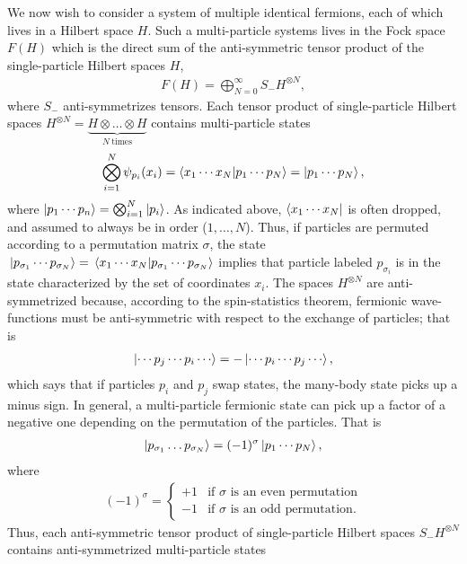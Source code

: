 \documentclass[Dual]{msu-thesis}
\begin{document}
We now wish to consider a system of multiple identical fermions, each of which lives in a Hilbert space $H$. Such a multi-particle systems lives in the Fock space $F(H)$ which is the direct sum of the anti-symmetric tensor product of the single-particle Hilbert spaces $H$,
\begin{align}
F(H)
=
\bigoplus_{N=0}^\infty S_-H^{\otimes N},
\end{align}
where $S_-$ anti-symmetrizes tensors. Each tensor product of single-particle Hilbert spaces $H^{\otimes N} = \underset{N \ \text{times}}{\underbrace{H\otimes\ldots \otimes H}}$ contains multi-particle states
\begin{align}
\bigotimes_{i=1}^N\psi_{p_i}(x_i)
=
\bra{x_1\cdots x_N}\ket{p_1\cdots p_N}
= 
\ket{p_1\cdots p_N},
\end{align}
where $\ket{p_1\cdots p_n}=\bigotimes_{i=1}^N\ket{p_i}$. As indicated above, $\bra{x_1\cdots x_N}$ is often dropped, and assumed to always be in order ($1,\ldots ,N$). Thus, if particles are permuted according to a permutation matrix $\sigma$, the state $\ket*{p_{\sigma_1}\cdots p_{\sigma_N}} = \bra*{x_1\cdots x_N}\ket*{p_{\sigma_1}\cdots p_{\sigma_N}}$
implies that particle labeled $p_{\sigma_i}$ is in the state characterized by the set of coordinates $x_i$. The spaces $H^{\otimes N}$ are anti-symmetrized because, according to the spin-statistics theorem, fermionic wave-functions must be anti-symmetric with respect to the exchange of particles; that is
\begin{align}
\ket{\cdots p_j \cdots p_i \cdots} = - \ket{\cdots p_i \cdots p_j \cdots},
\end{align}
which says that if particles $p_i$ and $p_j$ swap states, the many-body state picks up a minus sign. In general, a multi-particle fermionic state can pick up a factor of a negative one depending on the permutation of the particles. That is
\begin{align}
\ket{p_{{\sigma_1}}\ldots p_{{\sigma_N}}} = (-1)^\sigma\ket{p_1\cdots p_N},
\end{align}
where 
\begin{align}
(-1)^\sigma 
=
\begin{cases}
+1 & \text{if $\sigma$ is an even permutation}
\\
-1 & \text{if $\sigma$ is an odd permutation}.
\end{cases}
\end{align}
Thus, each anti-symmetric tensor product of single-particle Hilbert spaces $S_-H^{\otimes N}$ contains anti-symmetrized multi-particle states
\end{document}
